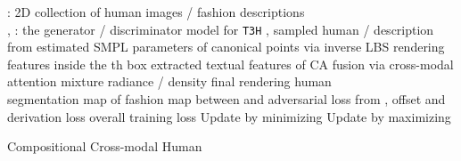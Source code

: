 \documentclass[11pt]{article}
\begin{document}
\begin{algorithm}[t]
    \begin{algorithmic}[1]
        \small
        \State : 2D collection of human images / fashion descriptions
        \\
        \State , : the generator / discriminator model for \texttt{T3H}
            \State ,   sampled human / description from 
            \State   estimated SMPL parameters of 
            \State   canonical points via inverse LBS 
            \State   rendering features inside the th box 
            \State   extracted textual features of 
            \State CA  fusion via cross-modal attention 
            \State   mixture radiance / density 
            \State   final rendering human 
            \\
            \State   segmentation map of 
            \State   fashion map between  and  
            \State   adversarial loss from  
            \State ,   offset and derivation loss 
            \State   overall training loss 
            \State Update  by minimizing 
            \State Update  by maximizing 
        \EndWhile
    \end{algorithmic}
    \caption{Compositional Cross-modal Human}
    \label{algo:cch}
\end{algorithm}
\end{document}
